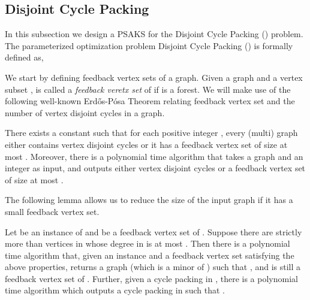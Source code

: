 

\subsection{Disjoint Cycle Packing}
In this subsection we  design a PSAKS for the {\sc Disjoint Cycle Packing ()} problem. 
The parameterized optimization problem {\sc Disjoint Cycle Packing ()} is formally defined as,





We start by defining feedback vertex sets of a graph. Given a graph  and a vertex subset ,  is called a {\em feedback veretx set} of  if  is a forest. 
We will make use of the following well-known Erd\H{o}s-P\'{o}sa Theorem relating feedback vertex set and the number of vertex disjoint  cycles in a graph. 
\begin{lemma}
\label{lemma:erdosposa}
There exists a constant  such that for each positive integer , every (multi) graph either contains  vertex disjoint cycles or it has a feedback vertex set of size at most . Moreover, there is a polynomial time algorithm that takes a graph  and an integer  as input, and outputs either  vertex disjoint cycles or a feedback vertex set of size at most . 
\end{lemma}

 The following lemma allows us to reduce the size of the input 
graph  if it has a small feedback vertex set. 

\begin{lemma}
 \label{lemma:leaf}
 Let  be an instance of \CP{} and  be a feedback vertex set of . Suppose there are strictly  
 more than  vertices in  whose degree in  is at most . 
Then there is a polynomial time 
algorithm  that, given an instance  and a feedback vertex set satisfying the above properties,
  returns a graph  (which is a minor of ) such that ,  and  is still a feedback vertex set of .  
Further, given a cycle packing  in , there is a polynomial time algorithm  which 
outputs a cycle packing  in  such that . 
\end{lemma}



